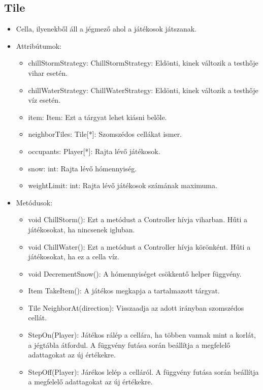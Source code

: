 \subsection{Tile}
\begin{itemize}
	\item Cella, ilyenekből áll a jégmező ahol a játékosok játszanak.
	\item Attribútumok:
	\begin{itemize}
		\item chillStormStrategy: ChillStormStrategy: Eldönti, kinek változik a testhője vihar esetén.
		\item chillWaterStrategy: ChillWaterStrategy: Eldönti, kinek változik a testhője víz esetén.
		\item item: Item: Ezt a tárgyat lehet kiásni belőle.
		\item neighborTiles: Tile[*]: Szomszédos cellákat ismer.
		\item occupants: Player[*]: Rajta lévő játékosok.
		\item snow: int: Rajta lévő hómennyiség.
		\item weightLimit: int: Rajta lévő játékosok számának maximuma.		
	\end{itemize}
	\item Metódusok:
	\begin{itemize}
		\item void ChillStorm(): Ezt a metódust a Controller hívja viharban. Hűti a játékosokat, ha nincsenek igluban.
		\item void ChillWater(): Ezt a metódust a Controller hívja körönként. Hűti a játékosokat, ha ez a cella víz.
		\item void DecrementSnow(): A hómennyiséget csökkentő helper függvény.
		\item Item TakeItem(): A játékos megkapja a tartalmazott tárgyat.
		\item Tile NeighborAt(direction): Visszaadja az adott irányban szomszédos cellát.
		\item StepOn(Player): Játékos rálép a cellára, ha többen vannak mint a korlát, a jégtábla átfordul. A függvény futása során beállítja a megfelelő adattagokat az új értékekre.
		\item StepOff(Player): Járékos lelép a celláról. A függvény futása során beállítja a megfelelő adattagokat az új értékekre.
	\end{itemize}
\end{itemize}

